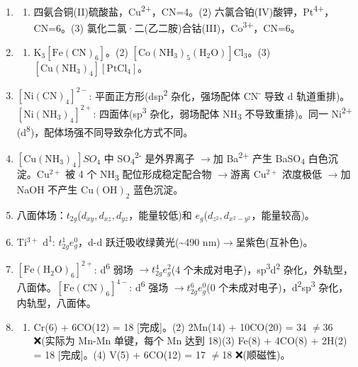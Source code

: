 \documentclass[a4paper,11pt]{ctexart}
\providecommand{\tightlist}{\setlength{\itemsep}{0pt}\setlength{\parskip}{0pt}}
\newcommand{\箭}{\ensuremath{\rightarrow}}
\newcommand{\左箭}{\ensuremath{\leftarrow}}
\newcommand{\上箭}{\ensuremath{\uparrow}}
\newcommand{\下箭}{\ensuremath{\downarrow}}
\newcommand{\衡}{\ensuremath{\rightleftharpoons}}
\newcommand{\双箭}{\ensuremath{\leftrightarrow}}
\newcommand{\约等于}{\ensuremath{\approx}}
\newcommand{\小于等于}{\ensuremath{\leq}}
\newcommand{\大于等于}{\ensuremath{\geq}}
\newcommand{\不等于}{\ensuremath{\neq}}
\newcommand{\西格马}{\ensuremath{\sigma}}
\newcommand{\派}{\ensuremath{\pi}}
\begin{document}
\begin{enumerate}
\def\labelenumi{\arabic{enumi}.}
\item
  \begin{enumerate}
  \def\labelenumii{(\arabic{enumii})}
  \tightlist
  \item
    四氨合铜(II)硫酸盐，Cu\textsuperscript{2+}，CN=4。(2) 六氯合铂(IV)酸钾，Pt\textsuperscript{4+}，CN=6。(3) 氯化二氯·二(乙二胺)合钴(III)，Co\textsuperscript{3+}，CN=6。
  \end{enumerate}
\item
  \begin{enumerate}
  \def\labelenumii{(\arabic{enumii})}
  \tightlist
  \item
    \(\mathrm{K_3[Fe(CN)_6]}\)。(2) \(\mathrm{[Co(NH_3)_5(H_2O)]Cl_3}\)。(3) \(\mathrm{[Cu(NH_3)_4][PtCl_4]}\)。
  \end{enumerate}
\item
  \(\mathrm{[Ni(CN)_4]^{2-}}\): 平面正方形(dsp\textsuperscript{2} 杂化，强场配体 CN\textsuperscript{-} 导致 d 轨道重排)。\(\mathrm{[Ni(NH_3)_4]^{2+}}\): 四面体(sp\textsuperscript{3} 杂化，弱场配体 NH\textsubscript{3} 不导致重排)。同一 Ni\textsuperscript{2+}(d\textsuperscript{8})，配体场强不同导致杂化方式不同。
\item
  \([\mathrm{Cu(NH_3)_4}]SO_4\) 中 SO\textsubscript{4}\textsuperscript{2-} 是外界离子 \箭 加 Ba\textsuperscript{2+} 产生 BaSO\textsubscript{4} 白色沉淀。\(\mathrm{Cu^{2+}}\) 被 4 个 NH\textsubscript{3} 配位形成稳定配合物 \箭 游离 \(\mathrm{Cu^{2+}}\) 浓度极低 \箭 加 NaOH 不产生 \(\mathrm{Cu(OH)_2}\) 蓝色沉淀。
\item
  八面体场：\(t_{2g}\)(\(d_{xy}, d_{xz}, d_{yz}\)，能量较低)和 \(e_g\)(\(d_{z^2}, d_{x^2-y^2}\)，能量较高)。
\item
  \(\mathrm{Ti^{3+}}\) d\textsuperscript{1}: \(t_{2g}^1 e_g^0\)，d-d 跃迁吸收绿黄光(\textasciitilde490 nm)\箭 呈紫色(互补色)。
\item
  \(\mathrm{[Fe(H_2O)_6]^{2+}}\): d\textsuperscript{6} 弱场 \箭 \(t_{2g}^4 e_g^2\)(4 个未成对电子)，sp\textsuperscript{3}d\textsuperscript{2} 杂化，外轨型，八面体。\(\mathrm{[Fe(CN)_6]^{4-}}\): d\textsuperscript{6} 强场 \箭 \(t_{2g}^6 e_g^0\)(0 个未成对电子)，d\textsuperscript{2}sp\textsuperscript{3} 杂化，内轨型，八面体。
\item
  \begin{enumerate}
  \def\labelenumii{(\arabic{enumii})}
  \tightlist
  \item
    Cr(6) + 6CO(12) = 18 {[}完成{]}。(2) 2Mn(14) + 10CO(20) = 34 \不等于 36 ❌(实际为 Mn-Mn 单键，每个 Mn 达到 18)(3) Fe(8) + 4CO(8) + 2H(2) = 18 {[}完成{]}。(4) V(5) + 6CO(12) = 17 \不等于 18 ❌(顺磁性)。

\end{enumerate}
\end{enumerate}
\end{document}
